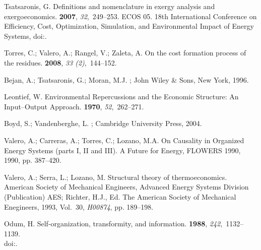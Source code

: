 \documentclass[energies,article,submit,moreauthors,pdftex]{Definitions/mdpi}
\begin{document}
\begin{thebibliography}{-------}
	Tsatsaronis, G.
	\newblock Definitions and nomenclature in exergy analysis and exergoeconomics.
	 {\bf 2007}, {\em 32},~249--253.
	\newblock ECOS 05. 18th International Conference on Efficiency, Cost,
	Optimization, Simulation, and Environmental Impact of Energy Systems,
	doi:{\href{https://doi.org/https://doi.org/10.1016/j.energy.2006.07.002}{}}.
	
	Torres, C.; Valero, A.; Rangel, V.; Zaleta, A.
	\newblock On the cost formation process of the residues.
	 {\bf 2008}, {\em 33 (2)},~144--152.
	
	Bejan, A.; Tsatsaronis, G.; Moran, M.J.
	;
	John Wiley \& Sons, New York, 1996.
	
	Leontief, W.
	\newblock Environmental {R}epercussions and the {E}conomic {S}tructure: {A}n
	{I}nput--{O}utput {A}pproach.
	 {\bf 1970}, {\em
		52},~262--271.

	Boyd, S.; Vandenberghe, L.
	; Cambridge University Press,  2004.

	Valero, A.; Carreras, A.; Torres, C.; Lozano, M.A.
	\newblock On {C}ausality in {O}rganized {E}nergy {S}ystems (parts {I}, {II} and
	{III}).
	\newblock  A Future for Energy, FLOWERS 1990,  1990, pp. 387--420.

	Valero, A.; Serra, L.; Lozano, M.
	\newblock Structural theory of thermoeconomics.
	\newblock  American Society of Mechanical Engineers, Advanced Energy Systems
	Division (Publication) AES; Richter, H.J., Ed. The American Society of
	Mechanical Enegineers,  1993, Vol.~30, {\em H00874}, pp. 189--198.

	Odum, H.
	\newblock Self-organization, transformity, and information.
	 {\bf 1988}, {\em 242},~1132--1139.\\
	\newblock
	doi:{\href{https://doi.org/10.1126/science.242.4882.1132}{}}.


\end{thebibliography}
\end{document}
